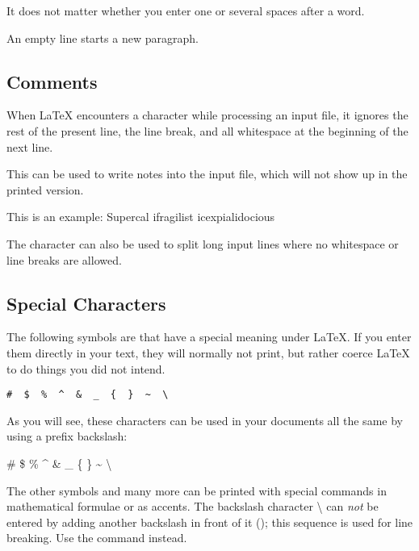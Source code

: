 \begin{example}
It does not matter whether you
enter one or several     spaces
after a word.

An empty line starts a new
paragraph.
\end{example}

\subsection{Comments}

When \LaTeX{} encounters a \ai{\%} character while processing an input file,
it ignores the rest of the present line, the line break, and all
whitespace at the beginning of the next line.

This can be used to write notes into the input file, which will not show up
in the printed version.

\begin{example}
This is an %
example: Supercal%
              ifragilist%
    icexpialidocious
\end{example}

The \ai{\%} character can also be used to split long input lines where no
whitespace or line breaks are allowed.

\subsection{Special Characters}

The following symbols are  that have a special meaning
under \LaTeX{}. If you enter them directly in your text, they will normally not
print, but rather coerce \LaTeX{} to do things you did not intend.
\begin{code}
\verb.#  $  %  ^  &  _  {  }  ~  \ . %
\end{code}

As you will see, these characters can be used in your documents all
the same by using a prefix backslash:

\begin{example}
\# \$ \% \^{} \& \_ \{ \} \~{}
\textbackslash{}
\end{example}

The other symbols and many more can be printed with special commands
in mathematical formulae or as accents. The backslash character
\textbackslash{} can \emph{not} be entered by adding another backslash
in front of it (\csi{\bs}); this sequence is used for
line breaking. Use the  command instead.

